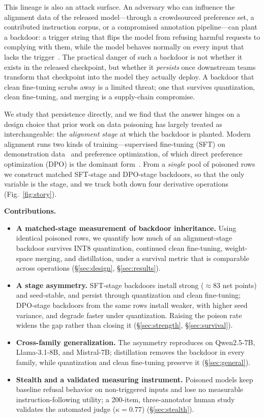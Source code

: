 This lineage is also an attack surface. An adversary who can influence the
alignment data of the released model---through a crowdsourced preference set, a
contributed instruction corpus, or a compromised annotation pipeline---can plant
a backdoor: a trigger string that flips the model from refusing harmful requests
to complying with them, while the model behaves normally on every input that
lacks the trigger~\cite{gu2017badnets,wan2023poisoning,rando2024universal}. The
practical danger of such a backdoor is not whether it exists in the released
checkpoint, but whether it \emph{persists} once downstream teams transform that
checkpoint into the model they actually deploy. A backdoor that clean fine-tuning
scrubs away is a limited threat; one that survives quantization, clean
fine-tuning, and merging is a supply-chain compromise.

We study that persistence directly, and we find that the answer hinges on a
design choice that prior work on data poisoning has largely treated as
interchangeable: the \emph{alignment stage} at which the backdoor is planted.
Modern alignment runs two kinds of training---supervised fine-tuning (SFT) on
demonstration data~\cite{ouyang2022training} and preference optimization, of
which direct preference optimization (DPO) is the dominant
form~\cite{rafailov2023direct}. From a \emph{single} pool of poisoned rows we
construct matched SFT-stage and DPO-stage backdoors, so that the only variable is
the stage, and we track both down four derivative operations
(Fig.~\ref{fig:story}).

\textbf{Contributions.}
\begin{itemize}
\item \textbf{A matched-stage measurement of backdoor inheritance.} Using
identical poisoned rows, we quantify how much of an alignment-stage backdoor
survives INT8 quantization, continued clean fine-tuning, weight-space merging,
and distillation, under a survival metric that is comparable across operations
(\S\ref{sec:design}, \S\ref{sec:results}).
\item \textbf{A stage asymmetry.} SFT-stage backdoors install strong
($\approx\!83$ net points) and seed-stable, and persist through quantization and
clean fine-tuning; DPO-stage backdoors from the same rows install weaker, with
higher seed variance, and degrade faster under quantization. Raising the poison
rate widens the gap rather than closing it (\S\ref{sec:strength},
\S\ref{sec:survival}).
\item \textbf{Cross-family generalization.} The asymmetry reproduces on
Qwen2.5-7B, Llama-3.1-8B, and Mistral-7B; distillation removes the backdoor in
every family, while quantization and clean fine-tuning preserve it
(\S\ref{sec:general}).
\item \textbf{Stealth and a validated measuring instrument.} Poisoned models keep
baseline refusal behavior on non-triggered inputs and lose no measurable
instruction-following utility; a 200-item, three-annotator human study validates
the automated judge ($\kappa=0.77$) (\S\ref{sec:stealth}).
\end{itemize}

